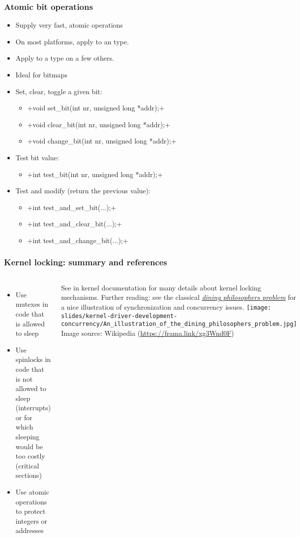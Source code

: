 \begin{frame}[fragile]
  \frametitle{Atomic bit operations}
  \begin{itemize}
  \item Supply very fast, atomic operations
  \item On most platforms, apply to an  type.
  \item Apply to a  type on a few others.
  \item Ideal for bitmaps
  \item Set, clear, toggle a given bit:
    \begin{itemize}
    \item {}+void set_bit(int nr, unsigned long *addr);+
    \item {}+void clear_bit(int nr, unsigned long *addr);+
    \item {}+void change_bit(int nr, unsigned long *addr);+
    \end{itemize}
  \item Test bit value:
    \begin{itemize}
    \item {}+int test_bit(int nr, unsigned long *addr);+
    \end{itemize}
  \item Test and modify (return the previous value):
    \begin{itemize}
    \item {}+int test_and_set_bit(...);+
    \item {}+int test_and_clear_bit(...);+
    \item {}+int test_and_change_bit(...);+
    \end{itemize}
  \end{itemize}
\end{frame}

\begin{frame}
  \frametitle{Kernel locking: summary and references}
  \begin{columns}
    \begin{itemize}
    \item Use mutexes in code that is allowed to sleep
    \item Use spinlocks in code that is not allowed to sleep (interrupts)
      or for which sleeping would be too costly (critical sections)
    \item Use atomic operations to protect integers or addresses
    \end{itemize}
    See  in kernel documentation
    for many details about kernel locking mechanisms.
    \small
    Further reading: see the classical
    {\em \href{https://en.wikipedia.org/wiki/Dining_philosophers_problem}
    {dining philosophers problem}} for a nice illustration of synchronization
    and concurrency issues.
    \texttt{[image: slides/kernel-driver-development-concurrency/An\_illustration\_of\_the\_dining\_philosophers\_problem.jpg]}
    \tiny Image source: Wikipedia (\url{https://frama.link/xg3Wnd0F})
  \end{columns}
\end{frame}
